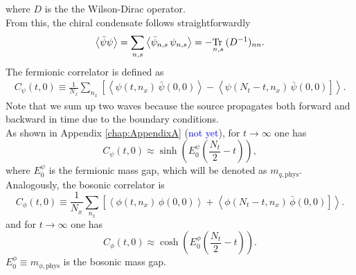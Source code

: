 where $D$ is the the Wilson-Dirac operator. \\
From this, the chiral condensate follows straightforwardly
\begin{equation*}
    \left\langle  \bar\psi \psi \right\rangle = \underset{n,s}\sum  \left\langle \bar\psi_{n,s} \, \psi_{n,s} \right\rangle = -\underset{n,s}{\operatorname{\text{Tr} \,}} \, (D^{-1})_{nn}.
\end{equation*}
The fermionic correlator is defined as
\begin{align*}
    C_\psi(t,0) \equiv \frac{1}{N_x} \sum_{n_x} \left[\left\langle \psi(t, n_x) \, \bar\psi(0,0)\right\rangle - \left\langle \psi(N_t-t, n_x) \, \bar\psi(0,0) \right] \right\rangle.
\end{align*}
Note that we sum up two waves because the source propagates both forward and backward in time due to the boundary conditions. \\
As shown in Appendix \ref{chap:AppendixA} (\textcolor{blue}{not yet}), for $t \to \infty$ one has 
\begin{equation*}
    C_\psi(t,0) \approx \sinh \left(E_0^{\psi} \left(\frac{N_t}{2} - t\right)\right),
\end{equation*}
where $E_0^{\psi}$ is the fermionic mass gap, which will be denoted as $m_{q,\text{phys}}$. \\
Analogously, the bosonic correlator is
\begin{equation*}
    C_\phi(t,0) \equiv \frac{1}{N_x} \sum_{n_x} \left[\left\langle \phi(t, n_x) \, \phi(0,0)\right\rangle + \left\langle \phi(N_t-t, n_x) \, \bar\phi(0,0) \right] \right\rangle.
\end{equation*}
and for $t \to \infty$ one has 
\begin{equation*}
    C_\phi(t,0) \approx \cosh \left(E_0^{\phi} \left(\frac{N_t}{2} - t\right)\right).
\end{equation*}
$E_0^{\phi} \equiv m_{\phi, \text{phys}}$ is the bosonic mass gap.